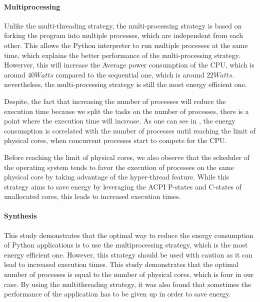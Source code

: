 \paragraph*{Multiprocessing}
Unlike the multi-threading strategy, the multi-processing strategy is based on forking the program into multiple processes, which are independent from each other. This allows the Python interpreter to run multiple processes at the same time, which explains the better performance of the multi-processing strategy. Howerver, this will increase the Average power consumption of the CPU, which is around $40 Watts$ compared to the sequential one, which is around $22 Watts$. nevertheless, the multi-processing strategy is still the most energy efficient one.


Despite, the fact that increasing the number of processes will reduce the execution time because we split the tasks on the number of processes, there is a point where the execution time will increase. As one can see in , the energy consumption is correlated with the number of processes until reaching the limit of physical cores, when concurrent processes start to compete for the CPU.


Before reaching the limit of physical cores, we also observe that the scheduler of the operating system tends to favor the execution of processes on the same physical core by taking advantage of the hyper-thread feature.
While this strategy aims to save energy by leveraging the ACPI P-states and C-states of unallocated cores, this leads to increased execution times.

\paragraph*{Synthesis}
This study demonstrates that the optimal way to reduce the energy consumption of Python applications is to use the multiprocessing strategy, which is the most energy efficient one. However, this strategy should be used with caution as it can lead to increased execution times.
This study demonstrates that the optimal number of processes is equal to the number of physical cores, which is four in our case.
By using the multithreading strategy, it was also found that sometimes the performance of the application has to be given up in order to save energy.

\clearpage

\clearpage
